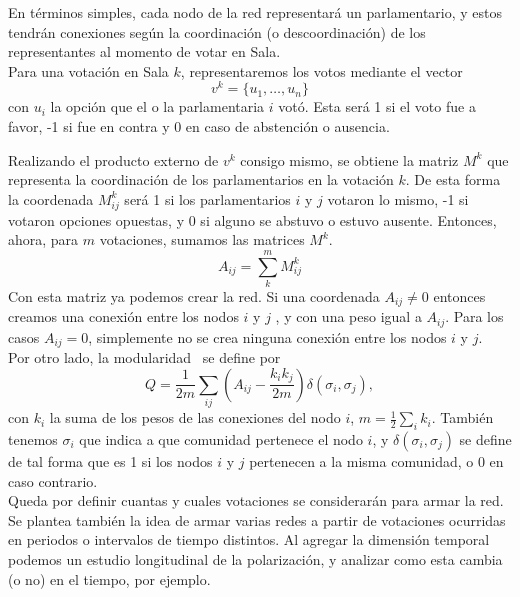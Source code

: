 \documentclass{proyectotesis}
\begin{document}
En términos simples, cada nodo de la red representará un parlamentario, y estos tendrán conexiones según la coordinación (o descoordinación) de los representantes al momento de votar en Sala.\\

Para una votación en Sala $k$, representaremos los votos mediante el vector 
\begin{equation}
    v^k = \{u_1,\dots,u_n\}
\end{equation}
con $u_i$ la opción que el o la parlamentaria $i$ votó. Esta será 1 si el voto fue a favor, -1 si fue en contra y 0 en caso de abstención o ausencia.

Realizando el producto externo de $v^k$ consigo mismo, se obtiene la matriz $M^k$ que representa la coordinación de los parlamentarios en la votación $k$. De esta forma la coordenada $M^k_{ij}$ será 1 si los parlamentarios $i$ y $j$ votaron lo mismo, -1 si votaron opciones opuestas, y 0 si alguno se abstuvo o estuvo ausente. Entonces, ahora, para $m$ votaciones, sumamos las matrices $M^k$.
\begin{equation}
    A_{ij} = \sum_k^m M^k_{ij} \label{adj}
\end{equation}
Con esta matriz ya podemos crear la red. Si una coordenada $A_{ij}\neq 0$ entonces creamos una conexión entre los nodos $i$ y $j$ , y con una peso igual a $A_{ij}$. Para los casos $A_{ij} = 0$, simplemente no se crea ninguna conexión entre los nodos $i$ y $j$.\\

Por otro lado, la modularidad~\cite{newman_finding_2004} se define por
\begin{equation}
    Q = \frac{1}{2m}\sum_{ij} \left( A_{ij} - \frac{k_i k_j}{2m}  \right) \delta(\sigma_i,\sigma_j) \label{mod}
,\end{equation}
con $k_i$ la suma de los pesos de las conexiones del nodo $i$, $m = \frac{1}{2} \sum_i k_i$. También tenemos $\sigma_i$ que indica a que comunidad pertenece el nodo $i$, y $\delta(\sigma_i,\sigma_j)$ se define de tal forma que es 1 si los nodos $i$ y $j$ pertenecen a la misma comunidad, o 0 en caso contrario.\\

Queda por definir cuantas y cuales votaciones se considerarán para armar la red. Se plantea también la idea de armar varias redes a partir de votaciones ocurridas en periodos o intervalos de tiempo distintos. Al agregar la dimensión temporal podemos un estudio longitudinal de la polarización, y analizar como esta cambia (o no) en el tiempo, por ejemplo.
\end{document}
